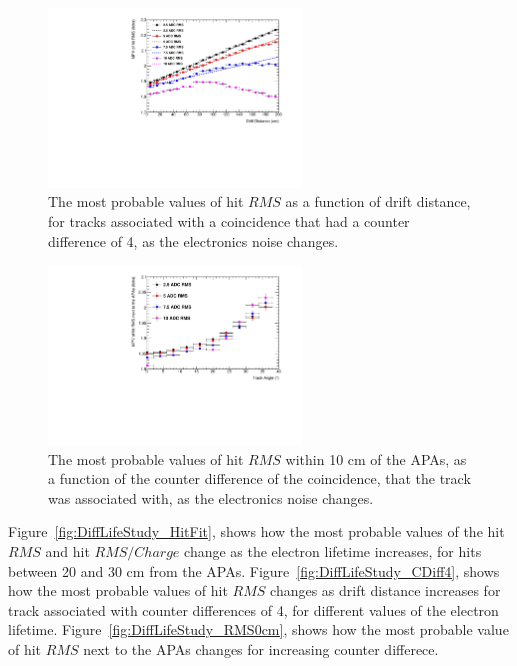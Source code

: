 \begin{figure}[h!]
  \centering
  \includegraphics[width=0.6\textwidth]{Canvas_CountDiff4_All_Positions_NoiseLevel}
  \caption[The drift distance dependence of diffusion in the 35 ton dataset and Monte Carlo for coincidences with a counter difference of 4, as the electronics noise changes]
          {The most probable values of hit $RMS$ as a function of drift distance, for tracks associated with a coincidence that had a counter difference of 4, as the electronics noise changes.}
  \label{fig:DiffNoiseStudy_CDiff4}
\end{figure}

\begin{figure}[h!]
  \centering
  \includegraphics[width=0.6\textwidth]{Canvas_All_Angles_RMS0cm_NoiseLevel}
  \caption[The angular dependence of diffusion in the 35 ton dataset and Monte Carlo for hits within 10 cm of the APAs, as the electronics noise changes]
          {The most probable values of hit $RMS$ within 10 cm of the APAs, as a function of the counter difference of the coincidence, that the track was associated with, as the electronics noise changes.}
  \label{fig:DiffNoiseStudy_RMS0cm}
\end{figure}

Figure~\ref{fig:DiffLifeStudy_HitFit}, shows how the most probable values of the hit $RMS$ and hit $RMS/Charge$ change as the electron lifetime increases, for hits between 20 and 30 cm from the APAs. Figure~\ref{fig:DiffLifeStudy_CDiff4}, shows how the most probable values of hit $RMS$ changes as drift distance increases for track associated with counter differences of 4, for different values of the electron lifetime. Figure~\ref{fig:DiffLifeStudy_RMS0cm}, shows how the most probable value of hit $RMS$ next to the APAs changes for increasing counter differece. \\ 

